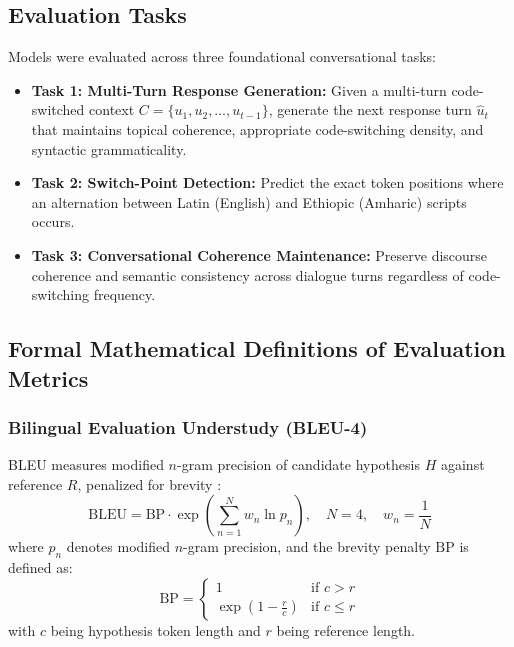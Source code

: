 \documentclass[11pt,a4paper]{article}
\begin{document}
\subsection{Evaluation Tasks}
Models were evaluated across three foundational conversational tasks:
\begin{itemize}
    \item \textbf{Task 1: Multi-Turn Response Generation:} Given a multi-turn code-switched context $C = \{u_1, u_2, \dots, u_{t-1}\}$, generate the next response turn $\hat{u}_t$ that maintains topical coherence, appropriate code-switching density, and syntactic grammaticality.
    \item \textbf{Task 2: Switch-Point Detection:} Predict the exact token positions where an alternation between Latin (English) and Ethiopic (Amharic) scripts occurs.
    \item \textbf{Task 3: Conversational Coherence Maintenance:} Preserve discourse coherence and semantic consistency across dialogue turns regardless of code-switching frequency.
\end{itemize}

\subsection{Formal Mathematical Definitions of Evaluation Metrics}

\subsubsection{Bilingual Evaluation Understudy (BLEU-4)}
BLEU measures modified $n$-gram precision of candidate hypothesis $H$ against reference $R$, penalized for brevity \cite{papineni2002bleu}:
\begin{equation}
    \text{BLEU} = \text{BP} \cdot \exp\left( \sum_{n=1}^{N} w_n \ln p_n \right), \quad N = 4, \quad w_n = \frac{1}{N}
\end{equation}
where $p_n$ denotes modified $n$-gram precision, and the brevity penalty $\text{BP}$ is defined as:
\begin{equation}
    \text{BP} = \begin{cases} 
        1 & \text{if } c > r \\ 
        \exp\left(1 - \frac{r}{c}\right) & \text{if } c \le r 
    \end{cases}
\end{equation}
with $c$ being hypothesis token length and $r$ being reference length.
\end{document}
